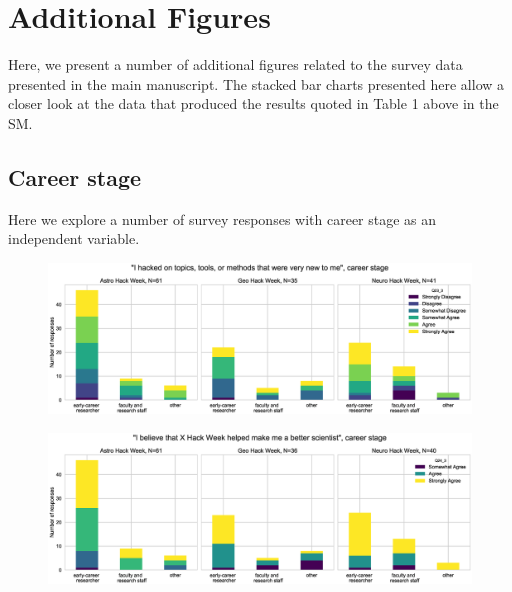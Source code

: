 \documentclass{aastex62}
\begin{document}
\clearpage

\section{Additional Figures}
\label{sec:suppfigures}
Here, we present a number of additional figures related to the survey data presented in the main manuscript. The stacked bar charts presented here allow a closer look at the data that produced the results quoted in Table 1 above in the SM.

\subsection{Career stage}

Here we explore a number of survey responses with career stage as an independent variable.

\begin{figure}[h!]
\centering
\includegraphics[width=\textwidth]{Q23_3_Q3_stackedbars.eps}
\caption{}
\label{fig:corr1}
\end{figure}

\begin{figure}[h!]
\centering
\includegraphics[width=\textwidth]{Q24_3_Q3_stackedbars.eps}
\caption{}
\label{fig:corr2}
\end{figure}
\end{document}
